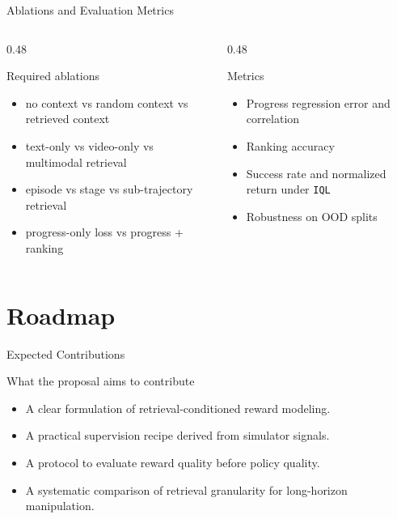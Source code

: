 \documentclass[aspectratio=169,11pt]{beamer}
\begin{document}
\begin{frame}[t]{Ablations and Evaluation Metrics}
\small
\begin{columns}[T,totalwidth=\textwidth]
  \begin{column}{0.48\textwidth}
    \begin{block}{Required ablations}
      \begin{itemize}
        \item no context vs random context vs retrieved context
        \item text-only vs video-only vs multimodal retrieval
        \item episode vs stage vs sub-trajectory retrieval
        \item progress-only loss vs progress + ranking
      \end{itemize}
    \end{block}
  \end{column}
  \begin{column}{0.48\textwidth}
    \begin{block}{Metrics}
      \begin{itemize}
        \item Progress regression error and correlation
        \item Ranking accuracy
        \item Success rate and normalized return under \texttt{IQL}
        \item Robustness on OOD splits
      \end{itemize}
    \end{block}
  \end{column}
\end{columns}
\end{frame}

\section{Roadmap}
\begin{frame}[t]{Expected Contributions}
\small
\begin{block}{What the proposal aims to contribute}
  \begin{itemize}
    \item A clear formulation of retrieval-conditioned reward modeling.
    \item A practical supervision recipe derived from simulator signals.
    \item A protocol to evaluate reward quality before policy quality.
    \item A systematic comparison of retrieval granularity for long-horizon manipulation.
  \end{itemize}
\end{block}
\end{frame}
\end{document}
